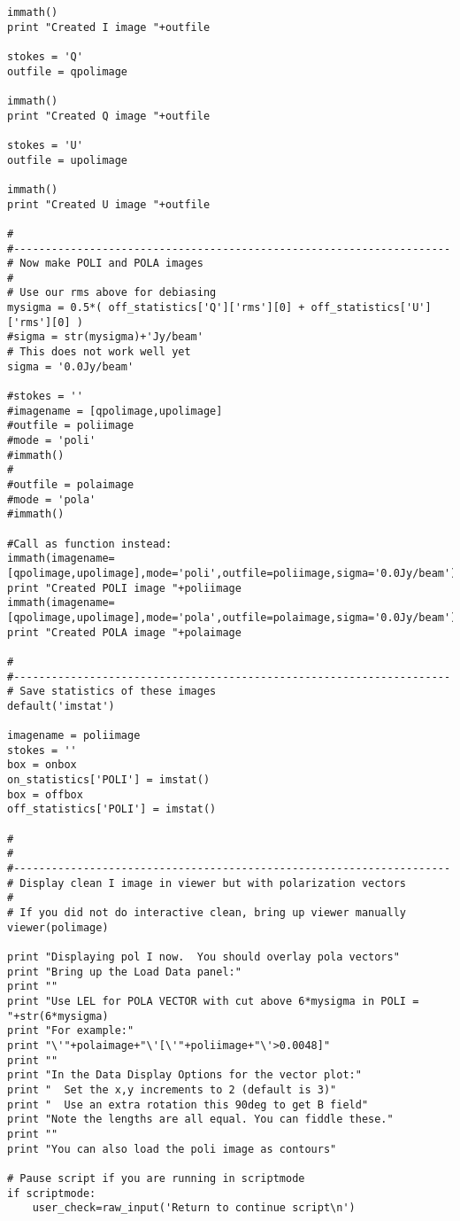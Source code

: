 \begin{verbatim}
immath()
print "Created I image "+outfile

stokes = 'Q'
outfile = qpolimage

immath()
print "Created Q image "+outfile

stokes = 'U'
outfile = upolimage

immath()
print "Created U image "+outfile

#
#---------------------------------------------------------------------
# Now make POLI and POLA images
#
# Use our rms above for debiasing
mysigma = 0.5*( off_statistics['Q']['rms'][0] + off_statistics['U']['rms'][0] )
#sigma = str(mysigma)+'Jy/beam'
# This does not work well yet
sigma = '0.0Jy/beam'

#stokes = ''
#imagename = [qpolimage,upolimage]
#outfile = poliimage
#mode = 'poli'
#immath()
#
#outfile = polaimage
#mode = 'pola'
#immath()

#Call as function instead:
immath(imagename=[qpolimage,upolimage],mode='poli',outfile=poliimage,sigma='0.0Jy/beam')
print "Created POLI image "+poliimage
immath(imagename=[qpolimage,upolimage],mode='pola',outfile=polaimage,sigma='0.0Jy/beam')
print "Created POLA image "+polaimage

#
#---------------------------------------------------------------------
# Save statistics of these images
default('imstat')

imagename = poliimage
stokes = ''
box = onbox
on_statistics['POLI'] = imstat()
box = offbox
off_statistics['POLI'] = imstat()

#
#
#---------------------------------------------------------------------
# Display clean I image in viewer but with polarization vectors
#
# If you did not do interactive clean, bring up viewer manually
viewer(polimage)

print "Displaying pol I now.  You should overlay pola vectors"
print "Bring up the Load Data panel:"
print ""
print "Use LEL for POLA VECTOR with cut above 6*mysigma in POLI = "+str(6*mysigma)
print "For example:"
print "\'"+polaimage+"\'[\'"+poliimage+"\'>0.0048]"
print ""
print "In the Data Display Options for the vector plot:"
print "  Set the x,y increments to 2 (default is 3)"
print "  Use an extra rotation this 90deg to get B field"
print "Note the lengths are all equal. You can fiddle these."
print ""
print "You can also load the poli image as contours"

# Pause script if you are running in scriptmode
if scriptmode:
    user_check=raw_input('Return to continue script\n')


\end{verbatim}
